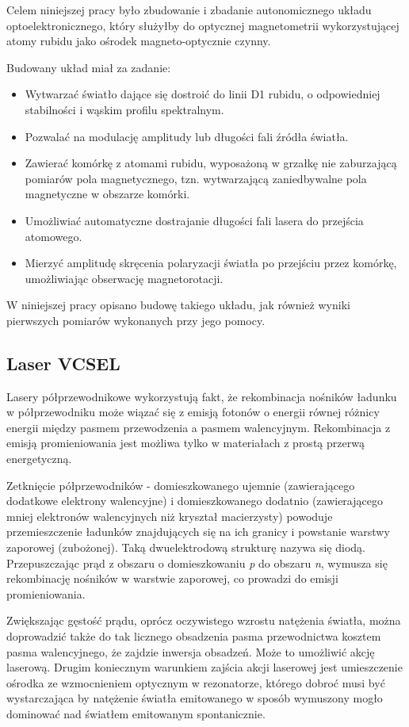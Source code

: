 \documentclass[a4paper,10pt,twoside]{article}
\begin{document}
Celem niniejszej pracy było zbudowanie i zbadanie autonomicznego układu optoelektronicznego, który służyłby do optycznej magnetometrii wykorzystującej atomy rubidu jako ośrodek magneto-optycznie czynny.

Budowany układ miał za zadanie:
\begin{itemize}
 \item Wytwarzać światło dające się dostroić do linii D1 rubidu, o odpowiedniej stabilności i wąskim profilu spektralnym.
 \item Pozwalać na modulację amplitudy lub długości fali źródła światła.
 \item Zawierać komórkę z atomami rubidu, wyposażoną w grzałkę nie zaburzającą pomiarów pola magnetycznego, tzn. wytwarzającą zaniedbywalne pola magnetyczne w obszarze komórki.
 \item Umożliwiać automatyczne dostrajanie długości fali lasera do przejścia atomowego. 
 \item Mierzyć amplitudę skręcenia polaryzacji światła po przejściu przez komórkę, umożliwiając obserwację magnetorotacji.
\end{itemize}

W niniejszej pracy opisano budowę takiego układu, jak również wyniki pierwszych pomiarów wykonanych przy jego pomocy.


\subsection{Laser VCSEL}


Lasery półprzewodnikowe wykorzystują fakt, że rekombinacja nośników ładunku w półprzewodniku może wiązać się z emisją fotonów o energii równej różnicy energii między pasmem przewodzenia a pasmem walencyjnym. Rekombinacja z emisją promieniowania jest możliwa tylko w materiałach z prostą przerwą energetyczną.


Zetknięcie półprzewodników - domieszkowanego ujemnie (zawierającego dodatkowe elektrony walencyjne) i domieszkowanego dodatnio (zawierającego mniej elektronów walencyjnych niż kryształ macierzysty) powoduje przemieszczenie ładunków znajdujących się na ich granicy i powstanie warstwy zaporowej (zubożonej). Taką dwuelektrodową strukturę nazywa się diodą. Przepuszczając prąd z obszaru o domieszkowaniu \textit{p} do obszaru \textit{n}, wymusza się rekombinację nośników w warstwie zaporowej, co prowadzi do emisji promieniowania.  

Zwiększając gęstość prądu, oprócz oczywistego wzrostu natężenia światła, można doprowadzić także do tak licznego obsadzenia pasma przewodnictwa kosztem pasma walencyjnego, że zajdzie inwersja obsadzeń. Może to umożliwić akcję laserową. Drugim koniecznym warunkiem zajścia akcji laserowej jest umieszczenie ośrodka ze wzmocnieniem optycznym w rezonatorze, którego dobroć musi być wystarczająca by natężenie światła emitowanego w sposób wymuszony mogło dominować nad światłem emitowanym spontanicznie.
\end{document}
